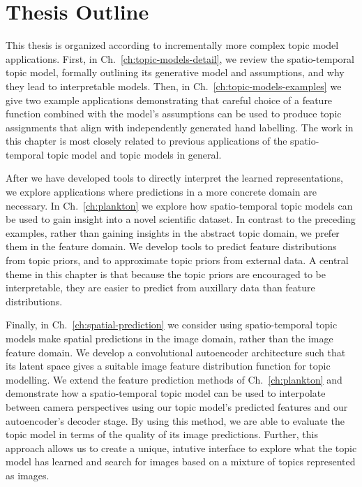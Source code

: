 \section{Thesis Outline} \label{sec:intro-outline}
This thesis is organized according to incrementally more complex topic model applications. First, in Ch.~\ref{ch:topic-models-detail}, we review the spatio-temporal topic model, formally outlining its generative model and assumptions, and why they lead to interpretable models. Then, in Ch.~\ref{ch:topic-models-examples} we give two example applications demonstrating that careful choice of a feature function combined with the model's assumptions can be used to produce topic assignments that align with independently generated hand labelling. The work in this chapter is most closely related to previous applications of the spatio-temporal topic model and topic models in general.

After we have developed tools to directly interpret the learned representations, we explore applications where predictions in a more concrete domain are necessary. In Ch.~\ref{ch:plankton} we explore how spatio-temporal topic models can be used to gain insight into a novel scientific dataset. In contrast to the preceding examples, rather than gaining insights in the abstract topic domain, we prefer them in the feature domain. We develop tools to predict feature distributions from topic priors, and to approximate topic priors from external data. A central theme in this chapter is that because the topic priors are encouraged to be interpretable, they are easier to predict from auxillary data than feature distributions.

Finally, in Ch.~\ref{ch:spatial-prediction} we consider using spatio-temporal topic models make spatial predictions in the image domain, rather than the image feature domain. We develop a convolutional autoencoder architecture such that its latent space gives a suitable image feature distribution function for topic modelling. We extend the feature prediction methods of Ch.~\ref{ch:plankton} and demonstrate how a spatio-temporal topic model can be used to interpolate between camera perspectives using our topic model's predicted features and our autoencoder's decoder stage. By using this method, we are able to evaluate the topic model in terms of the quality of its image predictions. Further, this approach allows us to create a unique, intutive interface to explore what the topic model has learned and search for images based on a mixture of topics represented as images.
